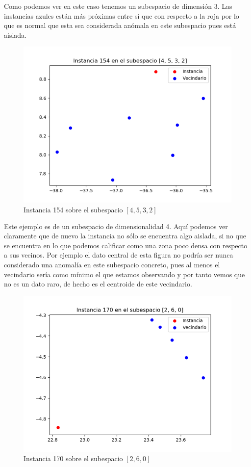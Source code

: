 Como podemos ver en este caso tenemos un subespacio de dimensión 3. Las instancias azules están más próximas entre sí que con respecto a la roja por lo que es normal que esta sea considerada anómala en este subespacio pues está aislada.

\begin{figure}[H]
	\centering
	\includegraphics[scale=0.7]{imagenes/173_tsne}
	\caption{Instancia 154 sobre el subespacio $[4,5,3,2]$}
	\label{173_tsne}
\end{figure}

Este ejemplo es de un subespacio de dimensionalidad 4. Aquí podemos ver claramente que de nuevo la instancia no sólo se encuentra algo aislada, si no que se encuentra en lo que podemos calificar como una zona poco densa con respecto a sus vecinos. Por ejemplo el dato central de esta figura no podría ser nunca considerado una anomalía en este subespacio concreto, pues al menos el vecindario sería como mínimo el que estamos observando y por tanto vemos que no es un dato raro, de hecho es el centroide de este vecindario.

\begin{figure}[H]
	\centering
	\includegraphics[scale=0.7]{imagenes/190_tsne}
	\caption{Instancia 170 sobre el subespacio $[2,6,0]$}
	\label{190_tsne}
\end{figure}

